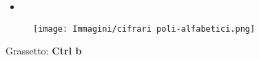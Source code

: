 \chapter{}

\section{}

\subsection{}

\paragraph{}


\begin{itemize}
    \item           
\end{itemize}


 \begin{figure}[H]
        \centering
        \texttt{[image: Immagini/cifrari poli-alfabetici.png]}
    \end{figure}


Grassetto: \textbf{Ctrl b}